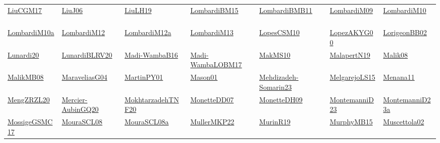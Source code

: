{\begin{longtable}{*{7}{l}}
\href{papers/LiuCGM17.pdf}{LiuCGM17}~\cite{LiuCGM17} & \href{papers/LiuJ06.pdf}{LiuJ06}~\cite{LiuJ06} & \href{papers/LiuLH19.pdf}{LiuLH19}~\cite{LiuLH19} & \href{papers/LombardiBM15.pdf}{LombardiBM15}~\cite{LombardiBM15} & \href{papers/LombardiBMB11.pdf}{LombardiBMB11}~\cite{LombardiBMB11} & \href{papers/LombardiM09.pdf}{LombardiM09}~\cite{LombardiM09} & \href{papers/LombardiM10.pdf}{LombardiM10}~\cite{LombardiM10}\\ 
\href{articles/LombardiM10a.pdf}{LombardiM10a}~\cite{LombardiM10a} & \href{articles/LombardiM12.pdf}{LombardiM12}~\cite{LombardiM12} & \href{articles/LombardiM12a.pdf}{LombardiM12a}~\cite{LombardiM12a} & \href{papers/LombardiM13.pdf}{LombardiM13}~\cite{LombardiM13} & \href{articles/LopesCSM10.pdf}{LopesCSM10}~\cite{LopesCSM10} & \href{articles/LopezAKYG00.pdf}{LopezAKYG00}~\cite{LopezAKYG00} & \href{}{LorigeonBB02}~\cite{LorigeonBB02}\\ 
\href{}{Lunardi20}~\cite{Lunardi20} & \href{articles/LunardiBLRV20.pdf}{LunardiBLRV20}~\cite{LunardiBLRV20} & \href{papers/Madi-WambaB16.pdf}{Madi-WambaB16}~\cite{Madi-WambaB16} & \href{papers/Madi-WambaLOBM17.pdf}{Madi-WambaLOBM17}~\cite{Madi-WambaLOBM17} & \href{papers/MakMS10.pdf}{MakMS10}~\cite{MakMS10} & \href{papers/MalapertN19.pdf}{MalapertN19}~\cite{MalapertN19} & \href{}{Malik08}~\cite{Malik08}\\ 
\href{}{MalikMB08}~\cite{MalikMB08} & \href{papers/MaraveliasG04.pdf}{MaraveliasG04}~\cite{MaraveliasG04} & \href{articles/MartinPY01.pdf}{MartinPY01}~\cite{MartinPY01} & \href{articles/Mason01.pdf}{Mason01}~\cite{Mason01} & \href{papers/Mehdizadeh-Somarin23.pdf}{Mehdizadeh-Somarin23}~\cite{Mehdizadeh-Somarin23} & \href{papers/MelgarejoLS15.pdf}{MelgarejoLS15}~\cite{MelgarejoLS15} & \href{}{Menana11}~\cite{Menana11}\\ 
\href{articles/MengZRZL20.pdf}{MengZRZL20}~\cite{MengZRZL20} & \href{papers/Mercier-AubinGQ20.pdf}{Mercier-AubinGQ20}~\cite{Mercier-AubinGQ20} & \href{}{MokhtarzadehTNF20}~\cite{MokhtarzadehTNF20} & \href{papers/MonetteDD07.pdf}{MonetteDD07}~\cite{MonetteDD07} & \href{papers/MonetteDH09.pdf}{MonetteDH09}~\cite{MonetteDH09} & \href{articles/MontemanniD23.pdf}{MontemanniD23}~\cite{MontemanniD23} & \href{articles/MontemanniD23a.pdf}{MontemanniD23a}~\cite{MontemanniD23a}\\ 
\href{papers/MossigeGSMC17.pdf}{MossigeGSMC17}~\cite{MossigeGSMC17} & \href{papers/MouraSCL08.pdf}{MouraSCL08}~\cite{MouraSCL08} & \href{papers/MouraSCL08a.pdf}{MouraSCL08a}~\cite{MouraSCL08a} & \href{articles/MullerMKP22.pdf}{MullerMKP22}~\cite{MullerMKP22} & \href{papers/MurinR19.pdf}{MurinR19}~\cite{MurinR19} & \href{papers/MurphyMB15.pdf}{MurphyMB15}~\cite{MurphyMB15} & \href{papers/Muscettola02.pdf}{Muscettola02}~\cite{Muscettola02}\\ 

\end{longtable}}
